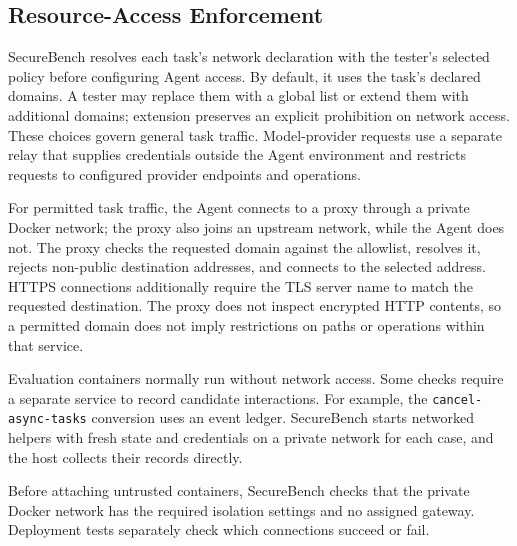 \documentclass[conference]{IEEEtran}
\begin{document}
\subsection{Resource-Access Enforcement}
\label{sec:resource-enforcement}

SecureBench resolves each task's network declaration with the tester's selected policy before configuring Agent access. By default, it uses the task's declared domains. A tester may replace them with a global list or extend them with additional domains; extension preserves an explicit prohibition on network access. These choices govern general task traffic. Model-provider requests use a separate relay that supplies credentials outside the Agent environment and restricts requests to configured provider endpoints and operations.

For permitted task traffic, the Agent connects to a proxy through a private Docker network; the proxy also joins an upstream network, while the Agent does not. The proxy checks the requested domain against the allowlist, resolves it, rejects non-public destination addresses, and connects to the selected address. HTTPS connections additionally require the TLS server name to match the requested destination. The proxy does not inspect encrypted HTTP contents, so a permitted domain does not imply restrictions on paths or operations within that service.

Evaluation containers normally run without network access. Some checks require a separate service to record candidate interactions. For example, the \texttt{cancel-async-tasks} conversion uses an event ledger. SecureBench starts networked helpers with fresh state and credentials on a private network for each case, and the host collects their records directly.

Before attaching untrusted containers, SecureBench checks that the private Docker network has the required isolation settings and no assigned gateway. Deployment tests separately check which connections succeed or fail.
\end{document}
